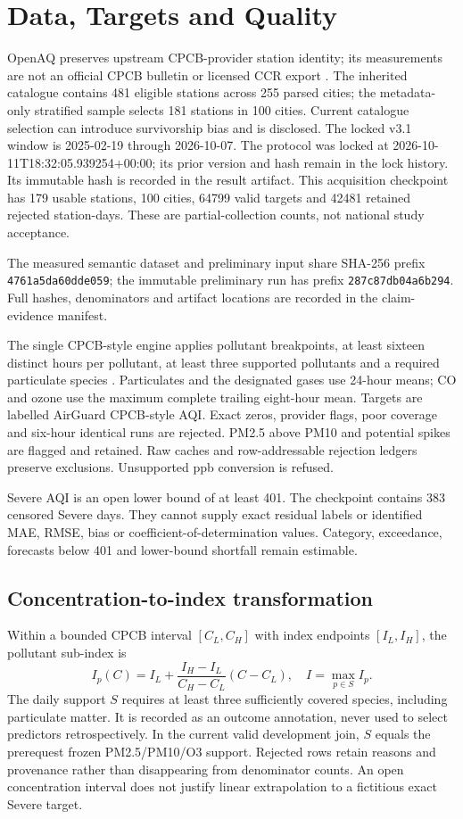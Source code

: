 \documentclass[journal]{IEEEtran}
\begin{document}
\clearpage
\section{Data, Targets and Quality}
OpenAQ preserves upstream CPCB-provider station identity; its measurements are
not an official CPCB bulletin or licensed CCR export \cite{openaq2026}.
The inherited catalogue contains 481 eligible stations across 255 parsed cities;
the metadata-only stratified sample selects 181 stations in 100 cities. Current
catalogue selection can introduce survivorship bias and is disclosed.
The locked v3.1 window is 2025-02-19 through 2026-10-07. The protocol was
locked at 2026-10-11T18:32:05.939254+00:00; its prior version and hash remain in the lock history.
Its immutable hash is recorded in the result artifact. This acquisition checkpoint has
179 usable stations, 100 cities, 64799 valid targets and 42481
retained rejected station-days. These are partial-collection counts, not
national study acceptance.

The measured semantic dataset and preliminary input share SHA-256 prefix \texttt{4761a5da60dde059}; the immutable preliminary run has prefix \texttt{287c87db04a6b294}. Full hashes, denominators and artifact locations are recorded in the claim-evidence manifest.

The single CPCB-style engine applies pollutant breakpoints, at least sixteen
distinct hours per pollutant, at least three supported pollutants and a required
particulate species \cite{cpcb2014aqi}. Particulates and the designated gases use
24-hour means; CO and ozone use the maximum complete trailing eight-hour mean.
Targets are labelled AirGuard CPCB-style AQI. Exact zeros, provider flags, poor
coverage and six-hour identical runs are rejected. PM2.5 above PM10 and potential
spikes are flagged and retained. Raw caches and row-addressable rejection ledgers
preserve exclusions. Unsupported ppb conversion is refused.

Severe AQI is an open lower bound of at least 401. The checkpoint contains
383 censored Severe days. They cannot supply exact residual labels or
identified MAE, RMSE, bias or coefficient-of-determination values. Category,
exceedance, forecasts below 401 and lower-bound shortfall remain estimable.
\subsection{Concentration-to-index transformation}
Within a bounded CPCB interval $[C_L,C_H]$ with index endpoints $[I_L,I_H]$,
the pollutant sub-index is
\begin{equation}
I_p(C)=I_L+\frac{I_H-I_L}{C_H-C_L}(C-C_L),\quad I=\max_{p\in S}I_p.
\end{equation}
The daily support $S$ requires at least three sufficiently covered species,
including particulate matter. It is recorded as an outcome annotation, never
used to select predictors retrospectively. In the current valid development
join, $S$ equals the prerequest frozen PM2.5/PM10/O3 support. Rejected rows
retain reasons and provenance rather than disappearing from denominator
counts. An open concentration interval does not justify linear extrapolation
to a fictitious exact Severe target.
\end{document}
